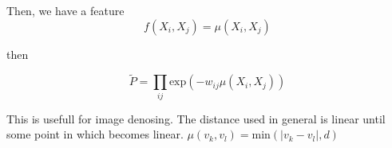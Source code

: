 Then, we have a feature
\begin{equation}
 f(X_i,X_j) = \mu(X_i, X_j)
\end{equation}

then 

\begin{equation}
 \tilde{P} = \prod_{ij} \text{exp}(-w_{ij}\mu(X_i,X_j))
\end{equation}

This is usefull for image denosing.
The distance used in general is linear until some point in which becomes linear. 
$\mu(v_k,v_l) = \text{min}(|v_k-v_l|,d)$










